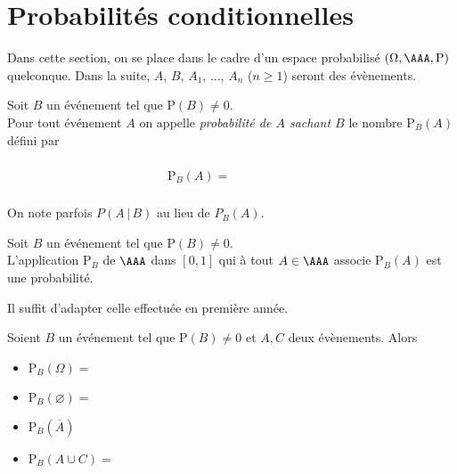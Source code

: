 \documentclass[french,11pt,twoside]{VcCours}
\renewcommand{\P}{\text{P}}
\begin{document}
\section{Probabilités conditionnelles}
Dans cette section, on se place dans le cadre d'un espace probabilisé $(\Omega, \AAA, \P)$ quelconque. Dans la suite, $A$, $B$, $A_1$, $\ldots$, $A_n$ ($n \geq 1$) seront des évènements.

\begin{Definition}{}
Soit $B$ un événement tel que $\P(B) \neq 0$.\\
Pour tout événement $A$ on appelle \emph{probabilité de $A$ sachant $B$} le nombre $\P_B(A)$ défini par 

$$ \P_B(A) = \phantom{\frac{\P(A\cap B)}{\P(B)}}$$

\end{Definition}

\begin{Remarque}{} On note parfois $P(A \, \vert \, B)$ au lieu de $P_B(A)$.
\end{Remarque}


\begin{Proposition}{}
Soit $B$ un événement tel que $\P(B) \neq 0$.\\
L'application $\P_B$ de $\AAA$ dans $[0,1]$ qui à tout $A \in \AAA$ associe $\P_B(A)$ est une probabilité.
\end{Proposition}

\begin{Demonstration}{}
Il suffit d'adapter celle effectuée en première année.
\end{Demonstration}
\begin{Corollaire}{}
Soient $B$ un événement tel que $\P(B) \ne 0$ et $A,C$ deux évènements. Alors 
 \begin{itemize}
  \item $\P_B(\Omega) = $
  \item $\P_B(\varnothing) = $
  \item $\P_B(\overline{A})$
  \item $\P_B(A\cup C) = $
 \end{itemize}
\end{Corollaire}
%
\end{document}
